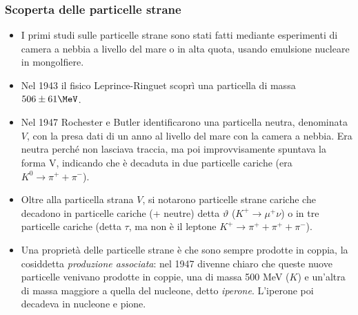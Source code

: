 \subsubsection{Scoperta delle particelle strane}
\begin{itemize}
    \item I primi studi sulle particelle strane sono stati fatti mediante esperimenti di camera a nebbia a livello del mare o in alta quota, usando emulsione nucleare in mongolfiere. 
    \item Nel 1943 il fisico Leprince-Ringuet scoprì una particella di massa $506\pm61\MeV$.
    \item Nel 1947 Rochester e Butler identificarono una particella neutra, denominata $V$, con la presa dati di un anno al livello del mare con la camera a nebbia. Era neutra perché non lasciava traccia, ma poi improvvisamente spuntava la forma V, indicando che è decaduta in due particelle cariche (era $K^0\to\pi^++\pi^-$).
    \item Oltre alla particella strana $V$, si notarono particelle strane cariche che decadono in particelle cariche (+ neutre) detta $\vartheta$ ($K^+\to\mu^+\nu$) o in tre particelle cariche (detta $\tau$, ma non è il leptone $K^+\to \pi^++\pi^++\pi^-$).
    \item Una proprietà delle particelle strane è che sono sempre prodotte in coppia, la cosiddetta \textit{produzione associata}: nel 1947 divenne chiaro che queste nuove particelle venivano prodotte in coppie, una di massa 500 MeV ($K$) e un'altra di massa maggiore a quella del nucleone, detto \textit{iperone}. L'iperone poi decadeva in nucleone e pione. 
\end{itemize}
